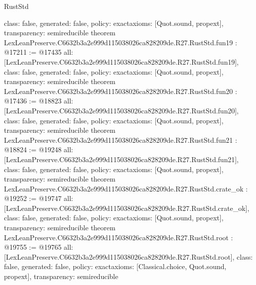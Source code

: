 \begin{lexlean}{RustStd}
\begin{coremodule}
{  class: false,
  generated: false,
  policy: exact{axioms: [Quot.sound, propext]},
  transparency: semireducible
}
theorem LexLeanPreserve.C6632b3a2e999d115038026ca828209de.R27.RustStd.fun19 : @17211 := @17435 {
  all: [LexLeanPreserve.C6632b3a2e999d115038026ca828209de.R27.RustStd.fun19],
  class: false,
  generated: false,
  policy: exact{axioms: [Quot.sound, propext]},
  transparency: semireducible
}
theorem LexLeanPreserve.C6632b3a2e999d115038026ca828209de.R27.RustStd.fun20 : @17436 := @18823 {
  all: [LexLeanPreserve.C6632b3a2e999d115038026ca828209de.R27.RustStd.fun20],
  class: false,
  generated: false,
  policy: exact{axioms: [Quot.sound, propext]},
  transparency: semireducible
}
theorem LexLeanPreserve.C6632b3a2e999d115038026ca828209de.R27.RustStd.fun21 : @18824 := @19248 {
  all: [LexLeanPreserve.C6632b3a2e999d115038026ca828209de.R27.RustStd.fun21],
  class: false,
  generated: false,
  policy: exact{axioms: [Quot.sound, propext]},
  transparency: semireducible
}
theorem LexLeanPreserve.C6632b3a2e999d115038026ca828209de.R27.RustStd.crate_ok : @19252 := @19747 {
  all: [LexLeanPreserve.C6632b3a2e999d115038026ca828209de.R27.RustStd.crate_ok],
  class: false,
  generated: false,
  policy: exact{axioms: [Quot.sound, propext]},
  transparency: semireducible
}
theorem LexLeanPreserve.C6632b3a2e999d115038026ca828209de.R27.RustStd.root : @19755 := @19765 {
  all: [LexLeanPreserve.C6632b3a2e999d115038026ca828209de.R27.RustStd.root],
  class: false,
  generated: false,
  policy: exact{axioms: [Classical.choice, Quot.sound, propext]},
  transparency: semireducible
}


\end{coremodule}
\end{lexlean}
